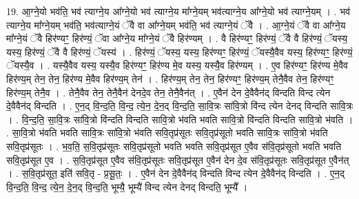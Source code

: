 \documentclass[17pt]{extarticle}
\begin{document}
19. आ॒ग्ने॒यो भव॑ति॒ भव॑ त्याग्ने॒य आ᳚ग्ने॒यो भव॑ त्याग्ने॒य मा᳚ग्ने॒यम् भव॑त्याग्ने॒य आ᳚ग्ने॒यो भव॑ त्याग्ने॒यम् । . भव॑ त्याग्ने॒य मा᳚ग्ने॒यम् भव॑ति॒ भव॑त्याग्ने॒यं ॅवै वा आ᳚ग्ने॒यम् भव॑ति॒ भव॑ त्याग्ने॒यं ॅवै । . आ॒ग्ने॒यं ॅवै वा आ᳚ग्ने॒य मा᳚ग्ने॒यं ॅवै हिर॑ण्यꣳ॒॒ हिर॑ण्यं॒ ॅवा आ᳚ग्ने॒य मा᳚ग्ने॒यं ॅवै हिर॑ण्यम् । . वै हिर॑ण्यꣳ॒॒ हिर॑ण्यं॒ ॅवै वै हिर॑ण्यं॒ ॅयस्य॒ यस्य॒ हिर॑ण्यं॒ ॅवै वै हिर॑ण्यं॒ ॅयस्य॑ । . हिर॑ण्यं॒ ॅयस्य॒ यस्य॒ हिर॑ण्यꣳ॒॒ हिर॑ण्यं॒ ॅयस्यै॒वैव यस्य॒ हिर॑ण्यꣳ॒॒ हिर॑ण्यं॒ ॅयस्यै॒व । . यस्यै॒वैव यस्य॒ यस्यै॒व हिर॑ण्यꣳ॒॒ हिर॑ण्य मे॒व यस्य॒ यस्यै॒व हिर॑ण्यम् । . ए॒व हिर॑ण्यꣳ॒॒ हिर॑ण्य मे॒वैव हिर॑ण्य॒म् तेन॒ तेन॒ हिर॑ण्य मे॒वैव हिर॑ण्य॒म् तेन॑ । . हिर॑ण्य॒म् तेन॒ तेन॒ हिर॑ण्यꣳ॒॒ हिर॑ण्य॒म् तेनै॒वैव तेन॒ हिर॑ण्यꣳ॒॒ हिर॑ण्य॒म् तेनै॒व । . तेनै॒वैव तेन॒ तेनै॒वैन॑ देनदे॒व तेन॒ तेनै॒वैन॑त् । . ए॒वैन॑ देन दे॒वैवैन॑द् विन्दति विन्द त्येन दे॒वैवैन॑द् विन्दति । . ए॒न॒द् वि॒न्द॒ति॒ वि॒न्द॒ त्ये॒न॒ दे॒न॒द् वि॒न्द॒ति॒ सा॒वि॒त्रः सा॑वि॒त्रो वि॑न्द त्येन देनद् विन्दति सावि॒त्रः । . वि॒न्द॒ति॒ सा॒वि॒त्रः सा॑वि॒त्रो वि॑न्दति विन्दति सावि॒त्रो भ॑वति भवति सावि॒त्रो वि॑न्दति विन्दति सावि॒त्रो भ॑वति । . सा॒वि॒त्रो भ॑वति भवति सावि॒त्रः सा॑वि॒त्रो भ॑वति सवि॒तृप्र॑सूतः सवि॒तृप्र॑सूतो भवति सावि॒त्रः सा॑वि॒त्रो भ॑वति सवि॒तृप्र॑सूतः । . भ॒व॒ति॒ स॒वि॒तृप्र॑सूतः सवि॒तृप्र॑सूतो भवति भवति सवि॒तृप्र॑सूत ए॒वैव स॑वि॒तृप्र॑सूतो भवति भवति सवि॒तृप्र॑सूत ए॒व । . स॒वि॒तृप्र॑सूत ए॒वैव स॑वि॒तृप्र॑सूतः सवि॒तृप्र॑सूत ए॒वैन॑ देन दे॒व स॑वि॒तृप्र॑सूतः सवि॒तृप्र॑सूत ए॒वैन॑त् । . स॒वि॒तृप्र॑सूत॒ इति॑ सवि॒तृ - प्र॒सू॒तः॒ । . ए॒वैन॑ देन दे॒वैवैन॑द् विन्दति विन्द त्येन दे॒वैवैन॑द् विन्दति । . ए॒न॒द् वि॒न्द॒ति॒ वि॒न्द॒ त्ये॒न॒ दे॒न॒द् वि॒न्द॒ति॒ भूम्यै॒ भूम्यै॑ विन्द त्येन देनद् विन्दति॒ भूम्यै᳚ । \newline
\end{document}
